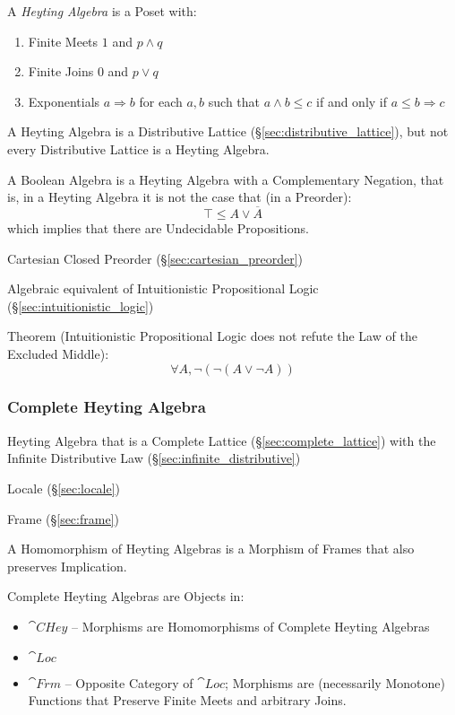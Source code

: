 A \emph{Heyting Algebra} is a Poset with:
\begin{enumerate}
  \item Finite Meets $1$ and $p \wedge q$
  \item Finite Joins $0$ and $p \vee q$
  \item Exponentials $a \Rightarrow b$ for each $a,b$ such that $a
    \wedge b \leq c$ if and only if $a \leq b \Rightarrow c$
\end{enumerate}
A Heyting Algebra is a Distributive Lattice
(\S\ref{sec:distributive_lattice}), but not every Distributive Lattice
is a Heyting Algebra.

A Boolean Algebra is a Heyting Algebra with a Complementary Negation,
that is, in a Heyting Algebra it is not the case that (in a Preorder):
\[
  \top \leq A \vee \overline{A}
\]
which implies that there are Undecidable Propositions.

Cartesian Closed Preorder (\S\ref{sec:cartesian_preorder})

Algebraic equivalent of Intuitionistic Propositional Logic
(\S\ref{sec:intuitionistic_logic})

Theorem (Intuitionistic Propositional Logic does not refute the Law of
the Excluded Middle)\cite{harper12}:
\[
  \forall A, \neg (\neg (A \vee \neg A))
\]



\subsubsection{Complete Heyting Algebra}\label{sec:complete_heyting}

Heyting Algebra that is a Complete Lattice
(\S\ref{sec:complete_lattice}) with the Infinite Distributive Law
(\S\ref{sec:infinite_distributive})

Locale (\S\ref{sec:locale})

Frame (\S\ref{sec:frame})

A Homomorphism of Heyting Algebras is a Morphism of Frames that also
preserves Implication.

Complete Heyting Algebras are Objects in:
\begin{itemize}
  \item $\cat{CHey}$ -- Morphisms are Homomorphisms of Complete
    Heyting Algebras
  \item $\cat{Loc}$
  \item $\cat{Frm}$ -- Opposite Category of $\cat{Loc}$; Morphisms are
    (necessarily Monotone) Functions that Preserve Finite Meets and
    arbitrary Joins.
\end{itemize}



